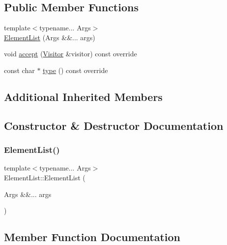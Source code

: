\subsection*{Public Member Functions}
\begin{DoxyCompactItemize}
\item 
{\footnotesize template$<$typename... Args$>$ }\\\hyperlink{struct_element_list_a887c628c7dd8cd458951ff97b63272a6}{Element\+List} (Args \&\&... args)
\item 
void \hyperlink{struct_element_list_a18e97e7ffed161a8f3f6a631550486fe}{accept} (\hyperlink{struct_visitor}{Visitor} \&visitor) const override
\item 
const char $\ast$ \hyperlink{struct_element_list_ae1da6b963a837e315c28dd017afc06a7}{type} () const override
\end{DoxyCompactItemize}
\subsection*{Additional Inherited Members}


\subsection{Constructor \& Destructor Documentation}
\mbox{\label{struct_element_list_a887c628c7dd8cd458951ff97b63272a6}} 
\subsubsection{\texorpdfstring{Element\+List()}{ElementList()}}
{\footnotesize\ttfamily template$<$typename... Args$>$ \\
Element\+List\+::\+Element\+List (\begin{DoxyParamCaption}\item[{Args \&\&...}]{args }\end{DoxyParamCaption})\hspace{0.3cm}{\ttfamily [inline]}}



\subsection{Member Function Documentation}
\mbox{\label{struct_element_list_a18e97e7ffed161a8f3f6a631550486fe}} 
